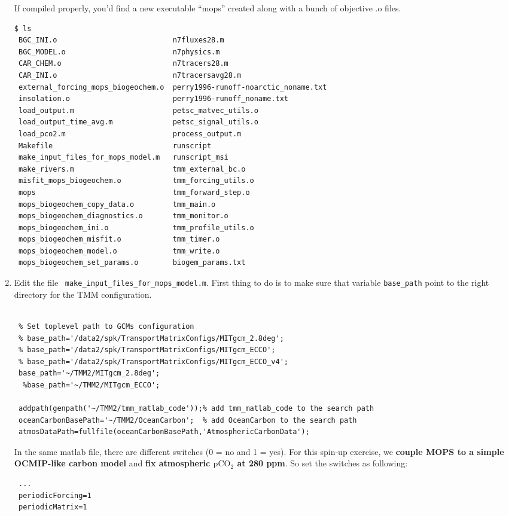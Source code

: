 \documentclass[a4paper]{article}
\def\noin{\noindent }
\begin{document}
\begin{enumerate}
\noin If compiled properly, you'd find a new executable ``mops'' created along with a bunch of objective .o files. 
\begin{lstlisting}[style=DOS]
 $ ls
 BGC_INI.o                           n7fluxes28.m
 BGC_MODEL.o                         n7physics.m
 CAR_CHEM.o                          n7tracers28.m
 CAR_INI.o                           n7tracersavg28.m
 external_forcing_mops_biogeochem.o  perry1996-runoff-noarctic_noname.txt
 insolation.o                        perry1996-runoff_noname.txt
 load_output.m                       petsc_matvec_utils.o
 load_output_time_avg.m              petsc_signal_utils.o
 load_pco2.m                         process_output.m
 Makefile                            runscript
 make_input_files_for_mops_model.m   runscript_msi
 make_rivers.m                       tmm_external_bc.o
 misfit_mops_biogeochem.o            tmm_forcing_utils.o
 mops                                tmm_forward_step.o
 mops_biogeochem_copy_data.o         tmm_main.o
 mops_biogeochem_diagnostics.o       tmm_monitor.o
 mops_biogeochem_ini.o               tmm_profile_utils.o
 mops_biogeochem_misfit.o            tmm_timer.o
 mops_biogeochem_model.o             tmm_write.o
 mops_biogeochem_set_params.o        biogem_params.txt
\end{lstlisting}

\item Edit the file \ \verb/make_input_files_for_mops_model.m/. First thing to do is to make sure that variable \verb/base_path/ point to the right directory for the TMM configuration.
\lstset{language=matlab} 
\begin{lstlisting}[frame=single,basicstyle=\scriptsize,commentstyle=\color{blue}]
 % make_input_files_for_mops_model.m
 
 % Set toplevel path to GCMs configuration
 % base_path='/data2/spk/TransportMatrixConfigs/MITgcm_2.8deg';
 % base_path='/data2/spk/TransportMatrixConfigs/MITgcm_ECCO';
 % base_path='/data2/spk/TransportMatrixConfigs/MITgcm_ECCO_v4';
 base_path='~/TMM2/MITgcm_2.8deg';
  %base_path='~/TMM2/MITgcm_ECCO';
  
 addpath(genpath('~/TMM2/tmm_matlab_code'));% add tmm_matlab_code to the search path
 oceanCarbonBasePath='~/TMM2/OceanCarbon';  % add OceanCarbon to the search path
 atmosDataPath=fullfile(oceanCarbonBasePath,'AtmosphericCarbonData');
\end{lstlisting}
\noin In the same matlab file, there are different switches (0 = no and 1 = yes). For this spin-up exercise, we \textbf{couple MOPS to a simple OCMIP-like carbon model} and \textbf{fix atmospheric $\mathrm{pCO_{2}}$ at 280 ppm}. So set the switches as following:
\begin{lstlisting}[frame=single,basicstyle=\scriptsize,commentstyle=\color{blue}]
 % make_input_files_for_mops_model.m
 ...
 periodicForcing=1 
 periodicMatrix=1
 

\end{lstlisting}
\end{enumerate}
\end{document}
